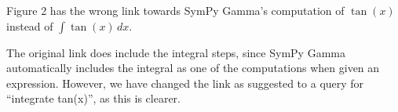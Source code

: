 \documentclass[answers,12pt]{exam}
\begin{document}
\begin{questions}
\question Figure 2 has the wrong link towards SymPy Gamma's computation of $\tan(x)$
 instead of $\int \tan(x)\,dx$.
\begin{solution}
The original link does include the integral steps, since SymPy Gamma
automatically includes the integral as one of the computations when given an
expression. However, we have changed the link as suggested to a query for
``integrate tan(x)'', as this is clearer.
\end{solution}

\end{questions}
\end{document}
